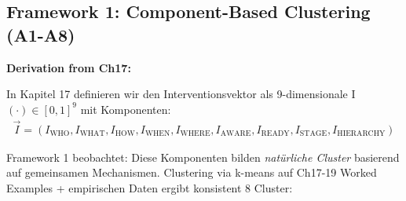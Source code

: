 \subsection{Framework 1: Component-Based Clustering (A1-A8)}
\label{subsec:20-framework-1}

\textbf{Derivation from Ch17:}

In Kapitel 17 definieren wir den Interventionsvektor als 9-dimensionale I$(\cdot) \in [0,1]^9$ mit Komponenten:
\begin{align}
\vec{I} = (I_{\text{WHO}}, I_{\text{WHAT}}, I_{\text{HOW}}, I_{\text{WHEN}}, I_{\text{WHERE}}, I_{\text{AWARE}}, I_{\text{READY}}, I_{\text{STAGE}}, I_{\text{HIERARCHY}})
\end{align}

Framework 1 beobachtet: Diese Komponenten bilden \textit{natürliche Cluster} basierend auf gemeinsamen Mechanismen. Clustering via k-means auf Ch17-19 Worked Examples + empirischen Daten ergibt konsistent 8 Cluster:

